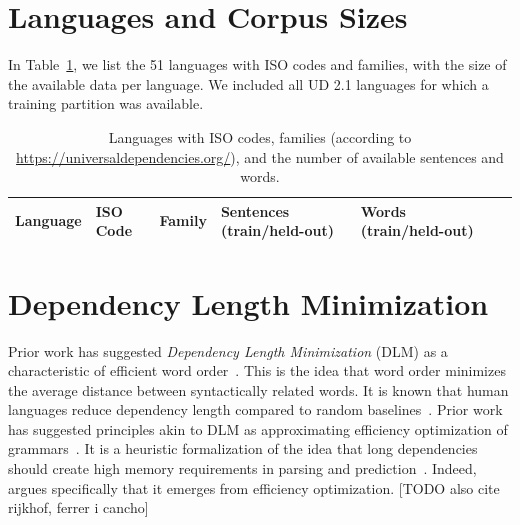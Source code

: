 \documentclass[10pt,twoside,lineno]{article}
\begin{document}
\section{Languages and Corpus Sizes}
In Table~\ref{tab:langs-iso-sizes}, we list the 51 languages with ISO codes and families, with the size of the available data per language.
We included all UD 2.1 languages for which a training partition was available.


\begin{table}[ht]
\small{
\begin{tabular}{lllllll}
Language & ISO Code & Family & Sentences (train/held-out) & Words (train/held-out) \\ \hline

\end{tabular}
}
\caption{Languages with ISO codes, families (according to \url{https://universaldependencies.org/}), and the number of available sentences and words.}\label{tab:langs-iso-sizes}
\end{table}



\section{Dependency Length Minimization}\label{sec:DLM}



Prior work has suggested \emph{Dependency Length Minimization} (DLM) as a characteristic of efficient word order~\cite{futrell2015largescale,liu2017dependency,temperley2018minimizing}.
This is the idea that word order minimizes the average distance between syntactically related words.
It is known that human languages reduce dependency length compared to random baselines~\cite{futrell2015largescale,liu2017dependency,temperley2018minimizing}.
Prior work has suggested principles akin to DLM as approximating efficiency optimization of grammars~\cite{hawkins1994performance,hawkins2004efficiency,futrell2017memory, futrell2017generalizing}.
It is a heuristic formalization of the idea that long dependencies should create high memory requirements in parsing and prediction~\cite{hawkins1994performance,gibson1998linguistic,gibson2000dependency, futrell2017memory}.
Indeed, \cite{futrell2017memory} argues specifically that it emerges from efficiency optimization.
[TODO also cite rijkhof, ferrer i cancho]
\end{document}
